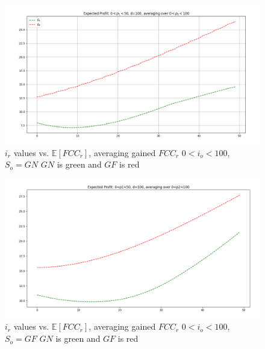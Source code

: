 \documentclass[a4paper,english,10pt]{article}
\newcommand\rob{\ensuremath{r}\xspace}
\newcommand\opp{\ensuremath{o}\xspace}
\newcommand{\fcc}{\ensuremath{FCC}\xspace}
\newcommand{\gn}{\ensuremath{GN}\xspace}
\newcommand{\gf}{\ensuremath{GF}\xspace}
\begin{document}

\begin{figure}
    \centering
    \includegraphics[width=\textwidth]{Images/E1_E2_p2A_abs.png}
    \caption{$i_\rob$ values vs. $\mathbb{E}[\fcc_\rob]$, averaging gained $\fcc_\rob$  $0<i_\opp<100$, $S_\opp=\gn$ \gn is green and \gf is red}
    \label{figures:1d unkown Io So=GN}
\end{figure}

\begin{figure}
    \centering
    \includegraphics[width=\textwidth]{Images/E1_E2_w_wo_abs.png}
    \caption{$i_\rob$ values vs. $\mathbb{E}[\fcc_\rob]$, averaging gained $\fcc_\rob$  $0<i_\opp<100$, $S_\opp=\gf$ \gn is green and \gf is red}
    \label{figures:1d unkown Io So=GF}
\end{figure}

\end{document}
